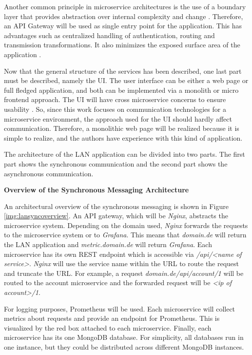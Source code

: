 Another common principle in microservice architectures is the use of a boundary layer that provides abstraction over internal complexity and change \cite[p.~66]{Bruce.2019}.
Therefore, an \ac{API} Gateway will be used as single entry point for the application.
This has advantages such as centralized handling of authentication, routing and transmission transformations.
It also minimizes the exposed surface area of the application \cite[p.~68f.]{Bruce.2019}.

Now that the general structure of the services has been described, one last part must be described, namely the \ac{UI}.
The user interface can be either a web page or full fledged application, and both can be implemented via a monolith or micro frontend approach.
The \ac{UI} will have cross microservice concerns to ensure usability \cite[p.~71f.]{Bruce.2019}.
So, since this work focuses on communication technologies for a microservice environment, the approach used for the \ac{UI} should hardly affect communication.
Therefore, a monolithic web page will be realized because it is simple to realize, and the authors have experience with this kind of application.

The architecture of the \ac{LAN} application can be divided into two parts.
The first part shows the synchronous communication and the second part shows the asynchronous communication.

\textbf{Overview of the Synchronous Messaging Architecture}

An architectural overview of the synchronous messaging is shown in Figure \ref{img:lansyncoverview}.
An \ac{API} gateway, which will be \textit{Nginx}, abstracts the microservice system.
Depending on the domain used, \textit{Nginx} forwards the requests to the microservice system or to \textit{Grafana}.
This means that \textit{domain.de} will return the \ac{LAN} application and \textit{metric.domain.de} will return \textit{Grafana}.
Each microservice has its own REST endpoint which is accessible via \textit{/api/<name of service>}.
\textit{Nginx} will use the service name within the \ac{URL} to route the request and truncate the \ac{URL}.
For example, a request \textit{domain.de/api/account/1} will be routed to the account microservice and the forwarded request will be \textit{<ip of account>/1}.

For logging purposes, Prometheus will be used.
Each microservice will collect metrics about requests and provide an endpoint for Prometheus.
This is visualized by the red box attached to each microservice.
Finally, each microservice has its one MongoDB database.
For simplicity, all databases run in one instance, but they could be distributed across different MongoDB instances.

